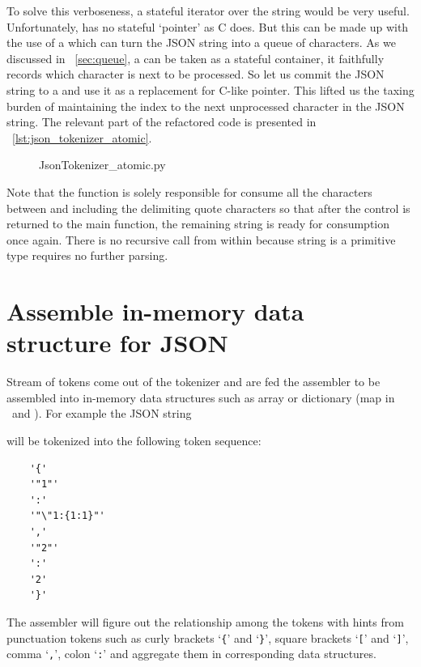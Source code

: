 To solve this verboseness, a stateful iterator over the string would be very useful.
Unfortunately, \python has no stateful `pointer' as C does.
But this can be made up with the use of a  which can turn the JSON string into a
queue of characters.
As we discussed in ~\autoref{sec:queue}, a  can be taken as a stateful container,
it faithfully records which character is next to be processed.
So let us commit the JSON string to a  and use it as a replacement for C-like pointer.
This lifted us the taxing burden of maintaining the index to the next unprocessed character
in the JSON string.
The relevant part of the refactored code is presented in ~\autoref{lst:json_tokenizer_atomic}.

\begin{figure}[H]
    
    {JsonTokenizer_atomic.py}
\end{figure}

Note that the function  is solely responsible for consume all the characters
between and including the delimiting quote characters so that after the control is returned to
the main function, the remaining string is ready for consumption once again.
There is no recursive call from within  because string is a primitive type
requires no further parsing.

\section{Assemble in-memory data structure for JSON}\label{sec:JsonAssembler}

Stream of tokens come out of the tokenizer and are fed the assembler
to be assembled into in-memory data structures such as array or dictionary
(map in \java ~and \cpp).
For example the JSON string
\begin{quote}
\end{quote}
will be tokenized into the following token sequence:
\begin{lstlisting}
    '{'
    '"1"'
    ':'
    '"\"1:{1:1}"'
    ','
    '"2"'
    ':'
    '2'
    '}'
\end{lstlisting}
The assembler will figure out the
relationship among the tokens with hints from punctuation tokens such as
curly brackets `\texttt{\{}' and `\texttt{\}}',
square brackets `\texttt{[}' and `\texttt{]}',
comma `\texttt{,}', colon `\texttt{:}'
and aggregate them in corresponding data structures.


